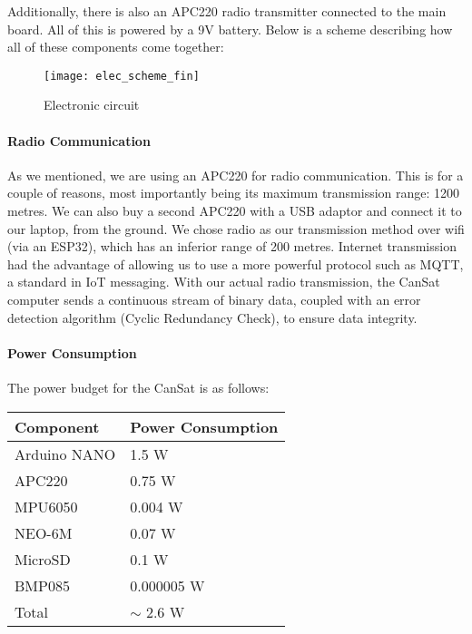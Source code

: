 Additionally, there is also an APC220 radio transmitter connected to the main board. All of this is powered by a 9V battery. Below is a scheme describing how all of these components come together:

\begin{figure}[H]
\centering
\texttt{[image: elec\_scheme\_fin]}
\caption{Electronic circuit}
\end{figure}

\paragraph{Radio Communication}

As we mentioned, we are using an APC220 for radio communication. This is for a couple of reasons, most importantly being its maximum transmission range: 1200 metres. We can also buy a second APC220 with a USB adaptor and connect it to our laptop, from the ground. We chose radio as our transmission method over wifi (via an ESP32), which has an inferior range of 200 metres. Internet transmission had the advantage of allowing us to use a more powerful protocol such as MQTT, a standard in IoT messaging. With our actual radio transmission, the CanSat computer sends a continuous stream of binary data, coupled with an error detection algorithm (Cyclic Redundancy Check), to ensure data integrity.

\paragraph{Power Consumption}

The power budget for the CanSat is as follows:

\begin{table}[H]
\centering
\begin{tabularx}{\textwidth}{|X|X|}
\hline
Component           & Power Consumption \\ \hline
Arduino NANO        & 1.5 W             \\
APC220              & 0.75 W            \\
MPU6050             & 0.004 W           \\
NEO-6M              & 0.07 W            \\
MicroSD             & 0.1 W              \\
BMP085              & 0.000005 W         \\ \hline
Total               & $ \sim $ 2.6 W     \\ \hline
\end{tabularx}
\end{table}

